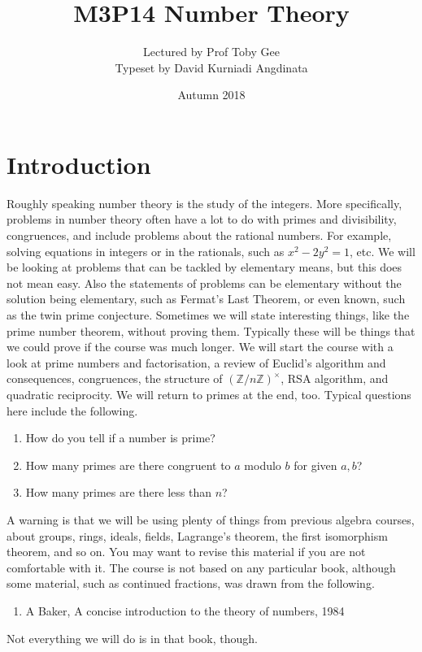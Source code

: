 \documentclass{article}
\title{M3P14 Number Theory}
\author{Lectured by Prof Toby Gee \\ Typeset by David Kurniadi Angdinata}
\date{Autumn 2018}
\newcommand{\Z}{\mathbb{Z}}
\newcommand{\rb}[1]{\left( #1 \right)}
\newcommand{\unit}[1]{\rb{\Z / #1\Z}^\times}
\theoremstyle{definition}\newtheorem{definition}{Definition}
\theoremstyle{definition}\newtheorem{remark}[definition]{Remark}
\theoremstyle{definition}\newtheorem*{example}{Example}
\theoremstyle{definition}\newtheorem*{note}{Note}
\begin{document}
\maketitle

\vfill

\tableofcontents

\pagebreak


\section{Introduction}

Roughly speaking number theory is the study of the integers. More specifically, problems in number theory often have a lot to do with primes and divisibility, congruences, and include problems about the rational numbers. For example, solving equations in integers or in the rationals, such as $ x^2 - 2y^2 = 1 $, etc. We will be looking at problems that can be tackled by elementary means, but this does not mean easy. Also the statements of problems can be elementary without the solution being elementary, such as Fermat's Last Theorem, or even known, such as the twin prime conjecture. Sometimes we will state interesting things, like the prime number theorem, without proving them. Typically these will be things that we could prove if the course was much longer. We will start the course with a look at prime numbers and factorisation, a review of Euclid's algorithm and consequences, congruences, the structure of $ \unit{n} $, RSA algorithm, and quadratic reciprocity. We will return to primes at the end, too. Typical questions here include the following.
\begin{enumerate}
\item How do you tell if a number is prime?
\item How many primes are there congruent to $ a $ modulo $ b $ for given $ a, b $?
\item How many primes are there less than $ n $?
\end{enumerate}
A warning is that we will be using plenty of things from previous algebra courses, about groups, rings, ideals, fields, Lagrange's theorem, the first isomorphism theorem, and so on. You may want to revise this material if you are not comfortable with it. The course is not based on any particular book, although some material, such as continued fractions, was drawn from the following.
\begin{enumerate}
\item A Baker, A concise introduction to the theory of numbers, 1984
\end{enumerate}
Not everything we will do is in that book, though.
\end{document}
